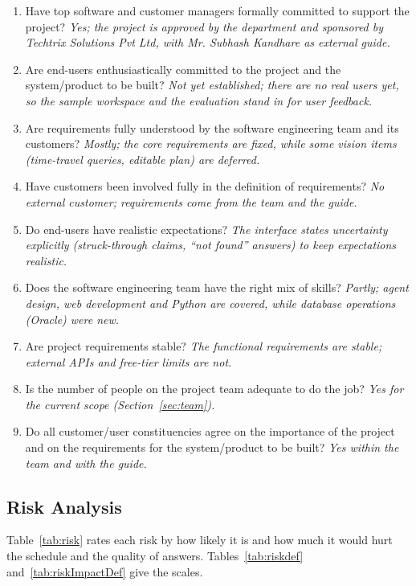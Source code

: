 \documentclass[oneside,a4paper,12pt]{report}
\begin{document}
\begin{enumerate}
\item Have top software and customer managers formally committed to support the project? \emph{Yes; the project is approved by the department and sponsored by Techtrix Solutions Pvt Ltd, with Mr. Subhash Kandhare as external guide.}
\item Are end-users enthusiastically committed to the project and the system/product to be built? \emph{Not yet established; there are no real users yet, so the sample workspace and the evaluation stand in for user feedback.}
\item Are requirements fully understood by the software engineering team and its customers? \emph{Mostly; the core requirements are fixed, while some vision items (time-travel queries, editable plan) are deferred.}
\item Have customers been involved fully in the definition of requirements? \emph{No external customer; requirements come from the team and the guide.}
\item Do end-users have realistic expectations? \emph{The interface states uncertainty explicitly (struck-through claims, ``not found'' answers) to keep expectations realistic.}
\item Does the software engineering team have the right mix of skills? \emph{Partly; agent design, web development and Python are covered, while database operations (Oracle) were new.}
\item Are project requirements stable? \emph{The functional requirements are stable; external APIs and free-tier limits are not.}
\item Is the number of people on the project team adequate to do the job? \emph{Yes for the current scope (Section~\ref{sec:team}).}
\item Do all customer/user constituencies agree on the importance of the project and on the requirements for the system/product to be built? \emph{Yes within the team and with the guide.}
\end{enumerate}

\subsection{Risk Analysis}
Table~\ref{tab:risk} rates each risk by how likely it is and how much it would hurt the schedule and the quality of answers. Tables~\ref{tab:riskdef} and~\ref{tab:riskImpactDef} give the scales.
\end{document}
